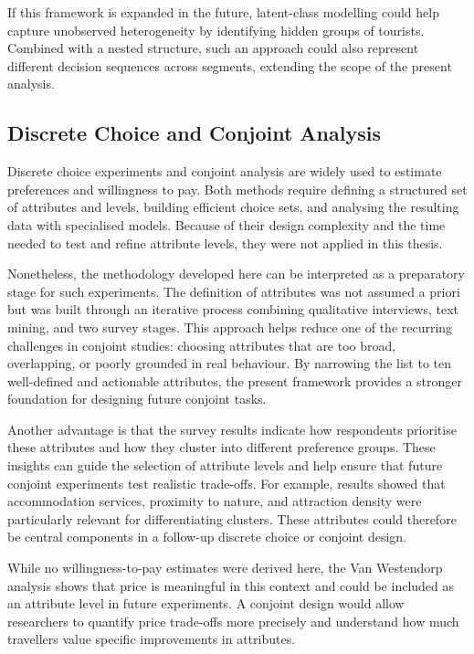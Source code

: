 \documentclass[a4paper, 12pt, twoside]{report}  %
\begin{document}
\indent If this framework is expanded in the future, latent-class modelling could help capture unobserved heterogeneity by identifying hidden groups of tourists. Combined with a nested structure, such an approach could also represent different decision sequences across segments, extending the scope of the present analysis.

\subsection{Discrete Choice and Conjoint Analysis}

\indent Discrete choice experiments and conjoint analysis are widely used to estimate preferences and willingness to pay. Both methods require defining a structured set of attributes and levels, building efficient choice sets, and analysing the resulting data with specialised models. Because of their design complexity and the time needed to test and refine attribute levels, they were not applied in this thesis.

\indent Nonetheless, the methodology developed here can be interpreted as a preparatory stage for such experiments. The definition of attributes was not assumed a priori but was built through an iterative process combining qualitative interviews, text mining, and two survey stages. This approach helps reduce one of the recurring challenges in conjoint studies: choosing attributes that are too broad, overlapping, or poorly grounded in real behaviour. By narrowing the list to ten well-defined and actionable attributes, the present framework provides a stronger foundation for designing future conjoint tasks.

\indent Another advantage is that the survey results indicate how respondents prioritise these attributes and how they cluster into different preference groups. These insights can guide the selection of attribute levels and help ensure that future conjoint experiments test realistic trade-offs. For example, results showed that accommodation services, proximity to nature, and attraction density were particularly relevant for differentiating clusters. These attributes could therefore be central components in a follow-up discrete choice or conjoint design.

\indent While no willingness-to-pay estimates were derived here, the Van Westendorp analysis shows that price is meaningful in this context and could be included as an attribute level in future experiments. A conjoint design would allow researchers to quantify price trade-offs more precisely and understand how much travellers value specific improvements in attributes.
\end{document}
